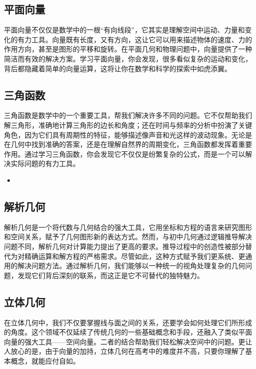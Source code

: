 \subsection{平面向量}

平面向量不仅仅是数学中的一根“有向线段”，它其实是理解空间中运动、力量和变化的有力工具。向量既有长度，又有方向，这让它可以用来描述物体的速度、力的作用方向，甚至是图形的平移和旋转。在平面几何和物理问题中，向量提供了一种简洁而有效的解决方案。学习平面向量，你会发现，很多看似复杂的运动和变化，背后都隐藏着简单的向量运算，这将让你在数学和科学的探索中如虎添翼。


\subsection{三角函数}

三角函数是数学中的一个重要工具，帮我们解决许多不同的问题。它不仅帮助我们解三角形，准确地计算三角形的边长和角度；还在时间与频率的分析中扮演了关键角色，因为它们具有周期性的特征，能够描述像声音和光这样的波动现象。无论是在几何中找到准确的答案，还是在理解自然界的周期变化，三角函数都发挥着重要作用。通过学习三角函数，你会发现它不仅仅是纷繁复杂的公式，而是一个可以解决实际问题的有力工具。

\begin{itemize}
\item {}
\end{itemize}
\subsection{解析几何}

解析几何是一个将代数与几何结合的强大工具，它用坐标和方程的语言来研究图形和空间关系，赋予了几何图形新的表达方式。然而，与初中几何通过逻辑推导解决问题不同，解析几何对计算能力提出了更高的要求。推导过程中的创造性被部分替代为对精确运算和解方程的严格需求。尽管如此，这种方式赋予我们更系统、更通用的解决问题方法。通过解析几何，我们能够以一种统一的视角处理复杂的几何问题，发现它们背后深刻的联系，而这正是它不可替代的独特魅力。


\subsection{立体几何}

在立体几何中，我们不仅要掌握线与面之间的关系，还要学会如何处理它们所形成的角度。这个领域不仅延续了传统几何的一些基础概念和手段，还融入了类似平面向量的强大工具——空间向量。二者的结合帮助我们轻松解决空间中的问题。更让人放心的是，由于向量的加持，立体几何在高考中的难度并不高，只要你理解了基本概念，就能应付自如。

